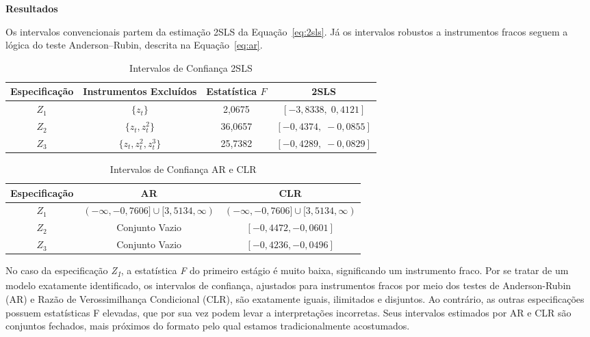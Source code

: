 \documentclass[12pt,a4paper]{article}
\begin{document}
\begin{enumerate}[label=\textbf{\arabic*.}]
\textbf{Resultados}

Os intervalos convencionais partem da estimação 2SLS da Equação~\eqref{eq:2sls}. Já os intervalos robustos a instrumentos fracos seguem a lógica do teste Anderson--Rubin, descrita na Equação~\eqref{eq:ar}.

\begin{table}[h]
    \centering
    \caption{Intervalos de Confiança 2SLS}
    \label{tab:q11_ic_2sls}
    \begin{tabular}{cccc}
        \hline
        Especificação & Instrumentos Excluídos & Estatística $F$ & 2SLS \\
        \hline
        $Z_{1}$ & $\{ z_{t} \}$ & 2,0675  & $[-3{,}8338,\; 0{,}4121]$ \\
        $Z_{2}$ & $\{ z_{t}, z_{t}^{2} \}$ & 36,0657 & $[-0{,}4374,\; -0{,}0855]$ \\
        $Z_{3}$ & $\{ z_{t}, z_{t}^{2}, z_{t}^{3} \}$ & 25,7382 & $[-0{,}4289,\; -0{,}0829]$ \\
        \hline
    \end{tabular}
\end{table}
\begin{table}[h]
    \centering
    \caption{Intervalos de Confiança AR e CLR}
    \label{tab:q11_ic_ar_clr}
    \begin{tabular}{c c c}
        \hline
        Especificação & AR & CLR \\
        \hline
        $Z_{1}$ & $(-\infty, -0{,}7606] \cup [3{,}5134, \infty)$ & $(-\infty, -0{,}7606] \cup [3{,}5134, \infty)$ \\
        $Z_{2}$ & Conjunto Vazio & $[-0{,}4472, -0{,}0601]$ \\
        $Z_{3}$ & Conjunto Vazio & $[-0{,}4236, -0{,}0496]$ \\
        \hline
    \end{tabular}
\end{table}

    No caso da especificação \textit{Z\textsubscript{1}}, a estatística \textit{F} do primeiro estágio é muito baixa, significando um instrumento fraco. Por se tratar de um modelo exatamente identificado, os intervalos de confiança, ajustados para instrumentos fracos por meio dos testes de Anderson-Rubin (AR) e Razão de Verossimilhança Condicional (CLR), são exatamente iguais, ilimitados e disjuntos. Ao contrário, as outras especificações possuem estatísticas F elevadas, que por sua vez podem levar a interpretações incorretas. Seus intervalos estimados por AR e CLR são conjuntos fechados, mais próximos do formato pelo qual estamos tradicionalmente acostumados. 


\end{enumerate}
\end{document}
